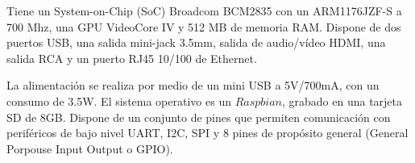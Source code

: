 \documentclass[twoside,11pt]{book}
\begin{document}

Tiene un System-on-Chip (SoC) Broadcom BCM2835 con un ARM1176JZF-S a 700 Mhz, una GPU VideoCore IV y 512 MB de memoria RAM. Dispone de dos puertos USB, una salida mini-jack 3.5mm, salida de audio/vídeo HDMI, una salida RCA y un puerto  RJ45 10/100 de Ethernet. 

La alimentación se realiza por medio de un mini USB a 5V/700mA, con un consumo de 3.5W. El sistema operativo es un $Raspbian$, grabado en una tarjeta SD de 8GB. Dispone de un conjunto de pines que permiten comunicación con periféricos de bajo nivel UART, I2C, SPI y 8 pines de propósito general (General Porpouse Input Output o GPIO).
\end{document}
